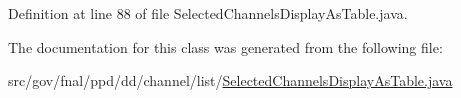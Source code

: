 Definition at line 88 of file Selected\-Channels\-Display\-As\-Table.\-java.



The documentation for this class was generated from the following file\-:\begin{DoxyCompactItemize}
\item 
src/gov/fnal/ppd/dd/channel/list/\hyperlink{SelectedChannelsDisplayAsTable_8java}{Selected\-Channels\-Display\-As\-Table.\-java}\end{DoxyCompactItemize}
